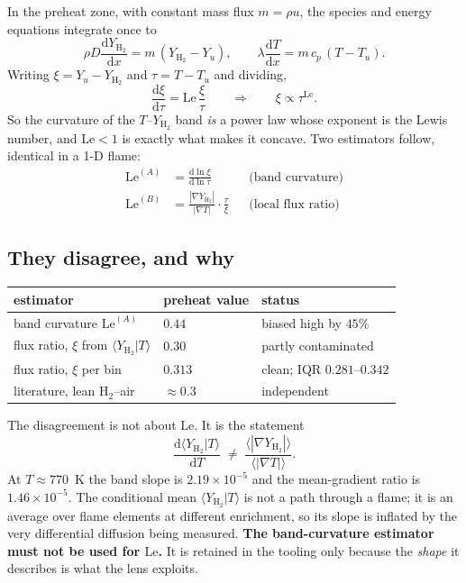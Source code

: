 \documentclass[11pt]{article}
\newcommand{\YH}{Y_{\mathrm{H_2}}}
\newcommand{\Le}{\mathrm{Le}}
\newcommand{\grad}{\nabla}
\newcommand{\dd}[2]{\frac{\mathrm{d}#1}{\mathrm{d}#2}}
\begin{document}
In the preheat zone, with constant mass flux $m = \rho u$, the species and
energy equations integrate once to
\begin{equation}
  \rho D \dd{\YH}{x} = m\,(\YH - Y_u), \qquad
  \lambda \dd{T}{x} = m\,c_p\,(T - T_u).
\end{equation}
Writing $\xi = Y_u - \YH$ and $\tau = T - T_u$ and dividing,
\begin{equation}
  \dd{\xi}{\tau} = \Le\,\frac{\xi}{\tau}
  \qquad\Longrightarrow\qquad
  \xi \propto \tau^{\Le}.
  \label{eq:powerlaw}
\end{equation}
So the curvature of the $T$--$\YH$ band \emph{is} a power law whose exponent
is the Lewis number, and $\Le<1$ is exactly what makes it concave. Two
estimators follow, identical in a 1-D flame:
\begin{align}
  \Le^{(A)} &= \dd{\ln \xi}{\ln \tau}
    &&\text{(band curvature)} \\
  \Le^{(B)} &= \frac{|\grad \YH|}{|\grad T|}\cdot\frac{\tau}{\xi}
    &&\text{(local flux ratio)}
\end{align}

\subsection{They disagree, and why}

\begin{center}
\begin{tabular}{lll}
\toprule
estimator & preheat value & status \\
\midrule
band curvature $\Le^{(A)}$ & $0.44$ & biased high by $45\%$ \\
flux ratio, $\xi$ from $\langle \YH|T\rangle$ & $0.30$ & partly contaminated \\
flux ratio, $\xi$ per bin & $\mathbf{0.313}$ & clean; IQR $0.281$--$0.342$ \\
literature, lean H$_2$--air & $\approx 0.3$ & independent \\
\bottomrule
\end{tabular}
\end{center}

The disagreement is not about $\Le$. It is the statement
\begin{equation}
  \dd{\langle \YH | T\rangle}{T} \;\neq\; \frac{\langle|\grad \YH|\rangle}{\langle|\grad T|\rangle}.
\end{equation}
At $T\approx770$~K the band slope is $2.19\times10^{-5}$ and the mean-gradient
ratio is $1.46\times10^{-5}$. The conditional mean $\langle \YH|T\rangle$ is
not a path through a flame; it is an average over flame elements at different
enrichment, so its slope is inflated by the very differential diffusion being
measured. \textbf{The band-curvature estimator must not be used for $\Le$.}
It is retained in the tooling only because the \emph{shape} it describes is
what the lens exploits.
\end{document}
